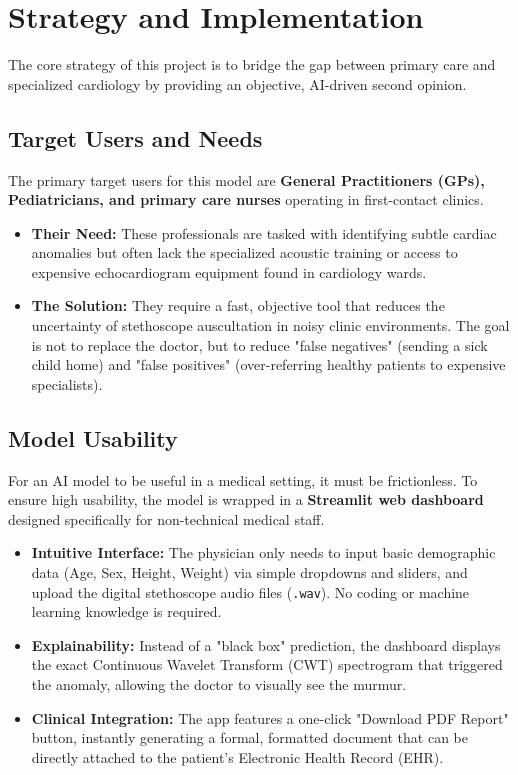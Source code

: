 \documentclass[11pt, a4paper]{article}
\begin{document}
\section{Strategy and Implementation}
The core strategy of this project is to bridge the gap between primary care and specialized cardiology by providing an objective, AI-driven second opinion.

\subsection{Target Users and Needs}
The primary target users for this model are \textbf{General Practitioners (GPs), Pediatricians, and primary care nurses} operating in first-contact clinics. 
\begin{itemize}
    \item \textbf{Their Need:} These professionals are tasked with identifying subtle cardiac anomalies but often lack the specialized acoustic training or access to expensive echocardiogram equipment found in cardiology wards. 
    \item \textbf{The Solution:} They require a fast, objective tool that reduces the uncertainty of stethoscope auscultation in noisy clinic environments. The goal is not to replace the doctor, but to reduce "false negatives" (sending a sick child home) and "false positives" (over-referring healthy patients to expensive specialists).
\end{itemize}

\subsection{Model Usability}
For an AI model to be useful in a medical setting, it must be frictionless. To ensure high usability, the model is wrapped in a \textbf{Streamlit web dashboard} designed specifically for non-technical medical staff.
\begin{itemize}
    \item \textbf{Intuitive Interface:} The physician only needs to input basic demographic data (Age, Sex, Height, Weight) via simple dropdowns and sliders, and upload the digital stethoscope audio files (\texttt{.wav}). No coding or machine learning knowledge is required.
    \item \textbf{Explainability:} Instead of a "black box" prediction, the dashboard displays the exact Continuous Wavelet Transform (CWT) spectrogram that triggered the anomaly, allowing the doctor to visually see the murmur.
    \item \textbf{Clinical Integration:} The app features a one-click "Download PDF Report" button, instantly generating a formal, formatted document that can be directly attached to the patient's Electronic Health Record (EHR).
\end{itemize}
\end{document}
